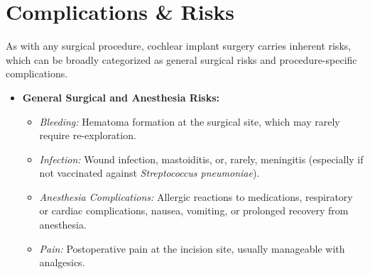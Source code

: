 \section*{Complications \& Risks}
As with any surgical procedure, cochlear implant surgery carries inherent risks, which can be broadly categorized as general surgical risks and procedure-specific complications.

\begin{itemize}
  \item \textbf{General Surgical and Anesthesia Risks:}
    \begin{itemize}
      \item \textit{Bleeding:} Hematoma formation at the surgical site, which may rarely require re-exploration.
      \item \textit{Infection:} Wound infection, mastoiditis, or, rarely, meningitis (especially if not vaccinated against \textit{Streptococcus pneumoniae}).
      \item \textit{Anesthesia Complications:} Allergic reactions to medications, respiratory or cardiac complications, nausea, vomiting, or prolonged recovery from anesthesia.
      \item \textit{Pain:} Postoperative pain at the incision site, usually manageable with analgesics.
    \end{itemize}


\end{itemize}
